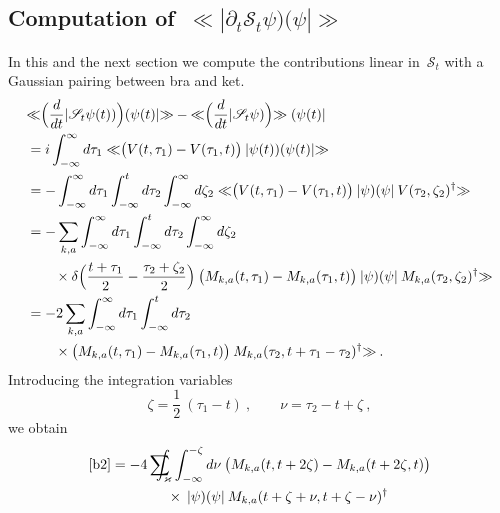 \documentclass[reqno,11pt]{amsart}
\numberwithin{equation}{section}
\newcommand{\bbra}{\mathopen{\ll}}
\newcommand{\kket}{\mathclose{\gg}}
\newcommand{\1}{\mathds{1}}
\newcommand{\Sig}{\mathscr{S}}
\newcommand{\sint}{\sum  \!\!\!\!\!\!\! \int }
\begin{document}
{\subsection{Computation of~$\bbra |\partial_t \Sig_t \psi)(\psi| \kket$}
In this and the next section we compute the contributions linear in~$\Sig_t$ with
a Gaussian pairing between bra and ket.
\begin{align}
&\bbra \Big( \frac{d}{dt} | \Sig_t \psi(t)) \Big)  ( \psi(t) | \kket - \bbra \Big( \frac{d}{dt} |\Sig_t \psi) \Big) \kket \; ( \psi(t)| \notag \\
&= i \int_{-\infty}^\infty d\tau_1 \;\bbra \big( V(t,\tau_1) - V(\tau_1,t) \big) \:|\psi(t))(\psi(t)| \kket \notag \\
&= -\int_{-\infty}^\infty d\tau_1 \int_{-\infty}^t d\tau_2 \int_{-\infty}^\infty d\zeta_2
\;\bbra \big( V(t,\tau_1) - V(\tau_1,t) \big) \:|\psi)(\psi|\: V(\tau_2, \zeta_2)^\dagger \kket \notag \\
&= - \sum_{k,a}\int_{-\infty}^\infty d\tau_1 \int_{-\infty}^t d\tau_2 \int_{-\infty}^\infty d\zeta_2 \notag \\
&\qquad \times \delta \Big( \frac{t+\tau_1}{2} - \frac{\tau_2+\zeta_2}{2} \Big) \:
\big( M_{k,a}(t,\tau_1) - M_{k,a}(\tau_1,t) \big) \:|\psi)(\psi|\: M_{k,a}(\tau_2, \zeta_2)^\dagger
\kket \notag \\
&= -2 \sum_{k,a}\int_{-\infty}^\infty d\tau_1 \int_{-\infty}^t d\tau_2 \notag \\
&\qquad \times
\big( M_{k,a}(t,\tau_1) - M_{k,a}(\tau_1,t) \big) \: M_{k,a}(\tau_2, t+\tau_1-\tau_2)^\dagger \kket \:. \label{b2}
\end{align}
Introducing the integration variables
\[ \zeta = \frac{1}{2}\:(\tau_1-t) \:,\qquad \nu = \tau_2 - t + \zeta\:, \]
we obtain
\begin{align*}
\eqref{b2} &= -4 \sint_\varkappa \int_{-\infty}^{-\zeta} d\nu \:
\big( M_{k,a} (t, t+2 \zeta)- M_{k,a} (t+2 \zeta, t)  \big) \\
&\qquad \qquad \times\: |\psi)(\psi|\: M_{k,a} (t+\zeta+\nu, t+\zeta-\nu)^\dagger
\end{align*}

}
\end{document}
